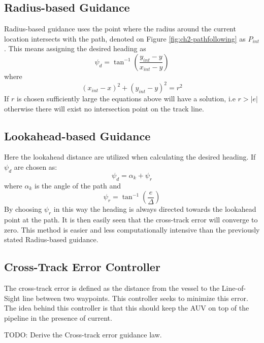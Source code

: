 	\subsection{Radius-based Guidance}
		Radius-based guidance uses the point where the radius around the current location intersects
		with the path, denoted on Figure \ref{fig:ch2-pathfollowing} as $P_{int}$. \cite{guidance_planar_path}
		This means assigning the desired heading as 
		\begin{equation}
			\psi_d = \tan^{-1}(\frac{y_{int} - y}{x_{int} - y})
		\end{equation}
		where 
		\begin{equation}
			(x_{int} - x)^2 + (y_{int} - y)^2 = r^2
		\end{equation}
		If $r$ is chosen sufficiently large the equations above will have a solution, i.e $r > |e|$
		otherwise there will exist no intersection point on the track line. 
	
	\subsection{Lookahead-based Guidance}
		Here the lookahead distance are utilized when calculating the desired heading. If $\psi_d$ are
		chosen as:
		\begin{equation}
			\psi_d = \alpha_k + \psi_r
		\end{equation}
		where $\alpha_k$ is the angle of the path and
		\begin{equation}
			\psi_r = \tan^{-1} (\frac{e}{\Delta})
		\end{equation}
		By choosing $\psi_r$ in this way the heading is always directed towards the lookahead point at
		the path. It is then easily seen that the cross-track error will converge to zero. This
		method is easier and less computationally intensive than the previously stated Radius-based
		guidance. \cite{guidance_planar_path}


	\subsection{Cross-Track Error Controller}
		The cross-track error is defined as the distance from the vessel to the Line-of-Sight line between 
		two waypoints. This controller seeks to minimize this error. The idea behind this controller is that 
		this should keep the AUV on top of the pipeline in the presence of current.
		
		TODO: Derive the Cross-track error guidance law. \cite{cross-track}
		
